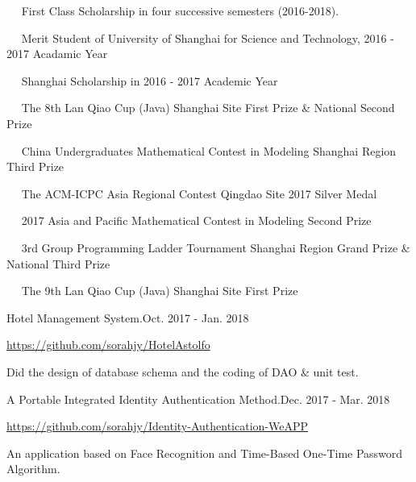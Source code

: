 \documentclass{sorahjy_cv}
\begin{document}
%
%

\begin{description}{}
	\item{\ \ } First Class Scholarship in four successive semesters (2016-2018).
	\item{\ \ } Merit Student of University of Shanghai for Science and Technology, 2016 - 2017 Acadamic Year
	\item{\ \ } Shanghai Scholarship in 2016 - 2017 Academic Year
	\item{\ \ } The 8th Lan Qiao Cup (Java) Shanghai Site {\color{orangeRed}First Prize} \& National {\color{orangeRed}Second Prize}
	\item{\ \ } China Undergraduates Mathematical Contest in Modeling Shanghai Region {\color{orangeRed}Third Prize}
	\item{\ \ } The ACM-ICPC Asia Regional Contest Qingdao Site 2017 {\color{orangeRed}Silver Medal}
	\item{\ \ } 2017 Asia and Pacific Mathematical Contest in Modeling {\color{orangeRed}Second Prize}
	\item{\ \ } 3rd Group Programming Ladder Tournament Shanghai Region {\color{orangeRed}Grand Prize} \& National {\color{orangeRed}Third Prize}
	\item{\ \ } The 9th Lan Qiao Cup (Java) Shanghai Site {\color{orangeRed}First Prize}
\end{description}


%
%




\begin{sectionContentSimple}{Hotel Management System.}{Oct. 2017 - Jan. 2018}
	\item \url{https://github.com/sorahjy/HotelAstolfo}
	\item Did the design of database schema and the coding of DAO \& unit test.
\end{sectionContentSimple}


\begin{sectionContentSimple}{A Portable Integrated Identity Authentication Method.}{Dec. 2017 - Mar. 2018}
	\item \url{https://github.com/sorahjy/Identity-Authentication-WeAPP}
	\item An application based on Face Recognition and Time-Based One-Time Password Algorithm.
\end{sectionContentSimple}
\end{document}
